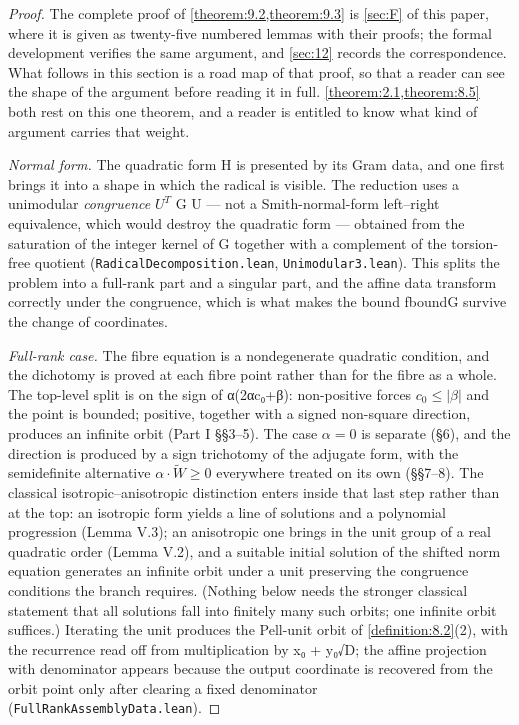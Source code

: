 \begin{proof}
The complete proof of \cref{theorem:9.2,theorem:9.3} is \cref{sec:F} of this paper, where it is given as twenty-five numbered lemmas with their proofs; the formal development verifies the same argument, and \cref{sec:12} records the correspondence. What follows in this section is a road map of that proof, so that a reader can see the shape of the argument before reading it in full. \cref{theorem:2.1,theorem:8.5} both rest on this one theorem, and a reader is entitled to know what kind of argument carries that weight.

\emph{Normal form.} The quadratic form H is presented by its Gram data, and one first brings it into a shape in which the radical is visible. The reduction uses a unimodular \emph{congruence} $U^{T}$ G U — not a Smith-normal-form left–right equivalence, which would destroy the quadratic form — obtained from the saturation of the integer kernel of G together with a complement of the torsion-free quotient (\texttt{RadicalDecomposition.\allowbreak{}lean}, \texttt{Unimodular3.\allowbreak{}lean}). This splits the problem into a full-rank part and a singular part, and the affine data transform correctly under the congruence, which is what makes the bound fboundG survive the change of coordinates.

\emph{Full-rank case.} The fibre equation is a nondegenerate quadratic condition, and the dichotomy is proved at each fibre point rather than for the fibre as a whole. The top-level split is on the sign of α(2αc₀+β): non-positive forces $c_{0} ≤ |β|$ and the point is bounded; positive, together with a signed non-square direction, produces an infinite orbit (Part I §§3–5). The case $α = 0$ is separate (§6), and the direction is produced by a sign trichotomy of the adjugate form, with the semidefinite alternative $α·\tilde{W} ≥ 0$ everywhere treated on its own (§§7–8). The classical isotropic–anisotropic distinction enters inside that last step rather than at the top: an isotropic form yields a line of solutions and a polynomial progression (Lemma V.3); an anisotropic one brings in the unit group of a real quadratic order (Lemma V.2), and a suitable initial solution of the shifted norm equation generates an infinite orbit under a unit preserving the congruence conditions the branch requires. (Nothing below needs the stronger classical statement that all solutions fall into finitely many such orbits; one infinite orbit suffices.) Iterating the unit produces the Pell-unit orbit of \cref{definition:8.2}(2), with the recurrence read off from multiplication by x₀ + y₀√D; the affine projection with denominator appears because the output coordinate is recovered from the orbit point only after clearing a fixed denominator (\texttt{FullRankAssemblyData.\allowbreak{}lean}).


\end{proof}
